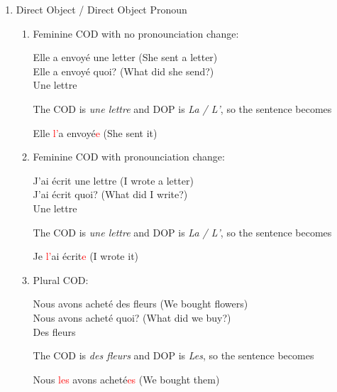 \documentclass{book}
\begin{document}
\begin{enumerate}
    \item Direct Object / Direct Object Pronoun
    
    \begin{enumerate}
        \item Feminine COD with no pronounciation change:
        \begin{center}
            Elle a envoyé une letter (She sent a letter) \\
            Elle a envoyé quoi? (What did she send?) \\
            Une lettre 
        \end{center}
        The COD is \textit{une lettre} and DOP is \textit{La / L'}, so the sentence becomes
        \begin{center}
            Elle \textcolor{red}{l'}a envoyé\textcolor{red}{e} (She sent it)
        \end{center}

        \item Feminine COD with pronounciation change:
        \begin{center}
            J'ai écrit une lettre (I wrote a letter) \\
            J'ai écrit quoi? (What did I write?) \\
            Une lettre
        \end{center}
        The COD is \textit{une lettre} and DOP is \textit{La / L'}, so the sentence becomes
        \begin{center}
            Je \textcolor{red}{l'}ai écrit\textcolor{red}{e} (I wrote it)
        \end{center}

        \item Plural COD:
        \begin{center}
            Nous avons acheté des fleurs (We bought flowers) \\
            Nous avons acheté quoi? (What did we buy?) \\
            Des fleurs
        \end{center}
        The COD is \textit{des fleurs} and DOP is \textit{Les}, so the sentence becomes
        \begin{center}
            Nous \textcolor{red}{les} avons acheté\textcolor{red}{es} (We bought them)
        \end{center}
    \end{enumerate}


\end{enumerate}
\end{document}
